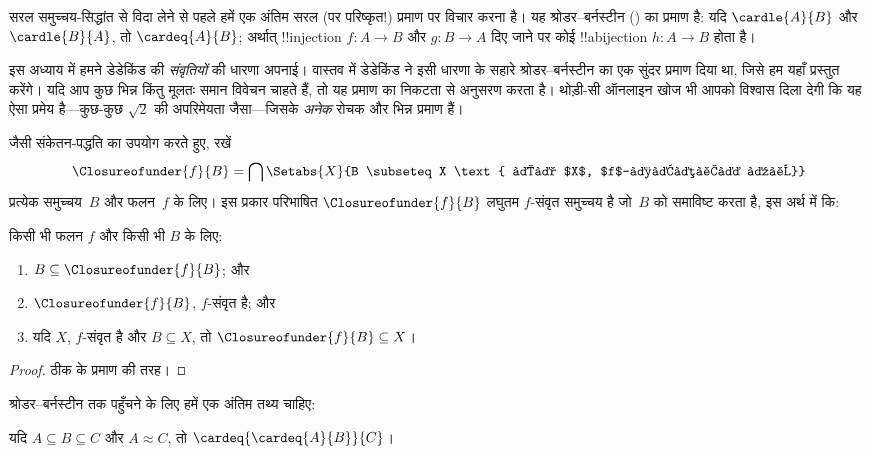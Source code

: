 \documentclass[../../../include/open-logic-section]{subfiles}
\begin{document}


सरल समुच्चय-सिद्धांत से विदा लेने से पहले हमें एक अंतिम सरल (पर परिष्कृत!)
प्रमाण पर विचार करना है। यह श्रोडर--बर्नस्टीन
() का प्रमाण है: यदि
$\cardle{A}{B}$ और $\cardle{B}{A}$, तो $\cardeq{A}{B}$; अर्थात् !!{injection}
$f \colon A \to B$ और $g \colon B \to A$ दिए जाने पर कोई !!a{bijection}
$h \colon A \to B$ होता है।

इस अध्याय में हमने डेडेकिंड की \emph{संवृतियों} की धारणा अपनाई। वास्तव में
डेडेकिंड ने इसी धारणा के सहारे श्रोडर--बर्नस्टीन का एक सुंदर प्रमाण दिया था,
जिसे हम यहाँ प्रस्तुत करेंगे। यदि आप कुछ भिन्न किंतु मूलतः समान विवेचन चाहते
हैं, तो यह प्रमाण \citet[पृ.~157--8]{Potter2004} का निकटता से अनुसरण करता है।
थोड़ी-सी ऑनलाइन खोज भी आपको विश्वास दिला देगी कि यह ऐसा प्रमेय है---कुछ-कुछ
$\sqrt{2}$ की अपरिमेयता जैसा---जिसके \emph{अनेक} रोचक और भिन्न प्रमाण हैं।

 जैसी संकेतन-पद्धति का उपयोग करते हुए,
रखें
\[
\Closureofunder{f}{B} = \bigcap \Setabs{X}{B \subseteq X 
\text{ और $X$, $f$-संवृत है}}
\]
प्रत्येक समुच्चय~$B$ और फलन~$f$ के लिए। इस प्रकार परिभाषित
$\Closureofunder{f}{B}$ लघुतम $f$-संवृत समुच्चय है जो~$B$ को समाविष्ट करता
है, इस अर्थ में कि:

\begin{lem}
	किसी भी फलन $f$ और किसी भी $B$ के लिए:
	\begin{enumerate}
		\item{} $B \subseteq \Closureofunder{f}{B}$; और
		\item{} $\Closureofunder{f}{B}$, $f$-संवृत है; और
		\item{} यदि $X$, $f$-संवृत है और $B
		\subseteq X$, तो $\Closureofunder{f}{B} \subseteq X$।
	\end{enumerate}
\end{lem}

\begin{proof}
ठीक  के प्रमाण की तरह।
\end{proof}

श्रोडर--बर्नस्टीन तक पहुँचने के लिए हमें एक अंतिम तथ्य चाहिए:

\begin{prop}
यदि $A \subseteq B \subseteq C$ और $A \approx C$, तो $\cardeq{\cardeq{A}{B}}{C}$।
\end{prop}
\end{document}
